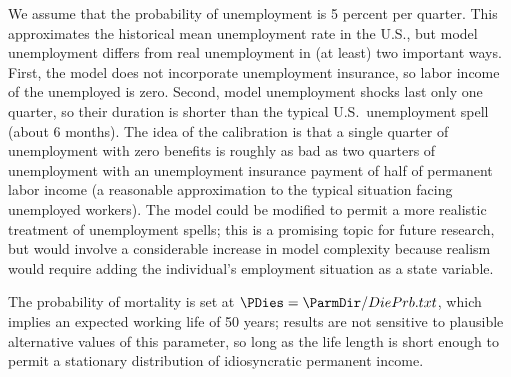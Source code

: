 We assume that the probability of unemployment is 5 percent per quarter.  This approximates the historical mean unemployment rate in the U.S., but model unemployment differs from real unemployment in (at least) two important ways.  First, the model does not incorporate unemployment insurance, so labor income of the unemployed is zero.  Second, model unemployment shocks last only one quarter, so their duration is shorter than the typical U.S.\ unemployment spell (about 6 months).  The idea of the calibration is that a single quarter of unemployment with zero benefits is roughly as bad as two quarters of unemployment with an unemployment insurance payment of half of permanent labor income (a reasonable approximation to the typical situation facing unemployed workers).  The model could be modified to permit a more realistic treatment of unemployment spells; this is a promising topic for future research, but would involve a considerable increase in model complexity because realism would require adding the individual's employment situation as a state variable.

The probability of mortality is set at $\PDies=  {\ParmDir/DiePrb.txt}$, which implies an expected working life of 50 years; results are not sensitive to plausible alternative values of this parameter, so long as the life length is short enough to permit a stationary distribution of idiosyncratic permanent income.